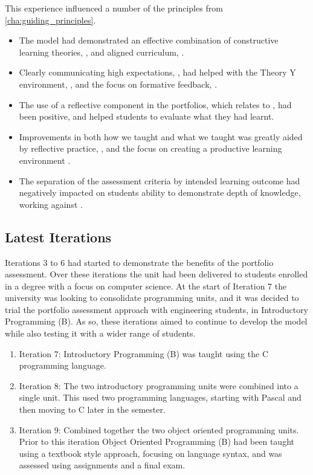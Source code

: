 This experience influenced a number of the principles from \cref{cha:guiding_principles}. 

\begin{itemize}[noitemsep,nolistsep]
	\item The model had demonstrated an effective combination of constructive learning theories, , and aligned curriculum, .
	\item Clearly communicating high expectations, , had helped with the Theory Y environment, , and the focus on formative feedback, .
	\item The use of a reflective component in the portfolios, which relates to , had been positive, and helped students to evaluate what they had learnt.
	\item Improvements in both how we taught and what we taught was greatly aided by reflective practice, , and the focus on creating a productive learning environment .
	\item The separation of the assessment criteria by intended learning outcome had negatively impacted on students ability to demonstrate depth of knowledge, working against .
\end{itemize}





\subsection{Latest Iterations} %
\label{sub:latest_iterations}

Iterations 3 to 6 had started to demonstrate the benefits of the portfolio assessment. Over these iterations the unit had been delivered to students enrolled in a degree with a focus on computer science. At the start of Iteration 7 the university was looking to consolidate programming units, and it was decided to trial the portfolio assessment approach with engineering students, in Introductory Programming (B). As so, these iterations aimed to continue to develop the model while also testing it with a wider range of students.

\begin{enumerate}
	\item Iteration 7: Introductory Programming (B) was taught using the C programming language.
	\item Iteration 8: The two introductory programming units were combined into a single unit. This used two programming languages, starting with Pascal and then moving to C later in the semester.
	\item Iteration 9: Combined together the two object oriented programming units. Prior to this iteration Object Oriented Programming (B) had been taught using a textbook style approach, focusing on language syntax, and was assessed using assignments and a final exam.
\end{enumerate}

